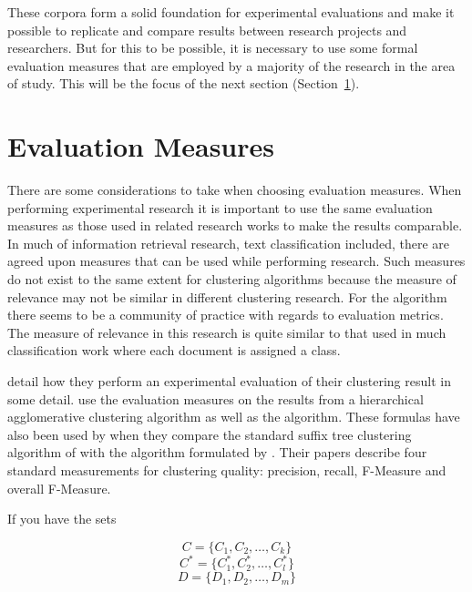 These corpora form a solid foundation for experimental evaluations and make it possible to replicate and compare results between research projects and researchers. But for this to be possible, it is necessary to use some formal evaluation measures that are employed by a majority of the research in the area of study. This will be the focus of the next section (Section~\ref{EvaluationMeasures}).

\section{Evaluation Measures}
\label{EvaluationMeasures}
There are some considerations to take when choosing evaluation measures. When performing experimental research it is important to use the same evaluation measures as those used in related research works to make the results comparable. In much of information retrieval research, text classification included, there are agreed upon measures that can be used while performing research. Such measures do not exist to the same extent for clustering algorithms because the measure of relevance may not be similar in different clustering research. For the \STC algorithm there seems to be a community of practice with regards to evaluation metrics. The measure of relevance in this research is quite similar to that used in much classification work where each document is assigned a class.

\cite{Chim2007} detail how they perform an experimental evaluation of their clustering result in some detail. \citeauthor{Chim2007} use the evaluation measures on the results from a hierarchical agglomerative clustering algorithm as well as the \STC algorithm. These formulas have also been used by \cite{Rafi2011} when they compare the standard suffix tree clustering algorithm of \citeauthor{Oren1998} with the algorithm formulated by \citeauthor{Chim2008}. Their papers describe four standard measurements for clustering quality: precision, recall, F-Measure and overall F-Measure.

If you have the sets

\begin{displaymath}
C = \{C_{1}, C_{2}, \dots, C_{k}\}
\end{displaymath}
\begin{displaymath}
C^* = \{C_1^*, C_2^*, \dots, C_l^*\}
\end{displaymath}
\begin{displaymath}
D = \{D_{1}, D_{2}, \dots, D_{m}\}
\end{displaymath}

